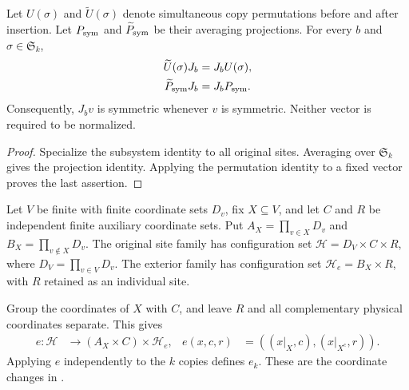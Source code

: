 \begin{theorem}
    \label{thm:added_site_insertion_copy_symmetry}
    \leanok
    Let $U(\sigma)$ and $\widetilde U(\sigma)$ denote simultaneous copy
    permutations before and after insertion. Let $P_{\rm sym}$ and
    $\widetilde P_{\rm sym}$ be their averaging projections.
    For every $b$ and $\sigma\in\mathfrak S_k$,
    \begin{align*}
        \widetilde U(\sigma)J_b&=J_bU(\sigma),\\
        \widetilde P_{\rm sym}J_b&=J_bP_{\rm sym}.
    \end{align*}
    Consequently, $J_bv$ is symmetric whenever $v$ is symmetric.
    Neither vector is required to be normalized.
\end{theorem}
\begin{proof}\leanok
    Specialize the subsystem identity to all original sites.
    Averaging over $\mathfrak S_k$ gives the projection identity.
    Applying the permutation identity to a fixed vector proves the last
    assertion.
\end{proof}

Let $V$ be finite with finite coordinate sets $D_v$, fix $X\subseteq V$,
and let $C$ and $R$ be independent finite auxiliary coordinate sets.
Put $A_X=\prod_{v\in X}D_v$ and
$B_X=\prod_{v\notin X}D_v$.
The original site family has configuration set
$\mathcal H=D_V\times C\times R$, where
$D_V=\prod_{v\in V}D_v$.
The exterior family has configuration set
$\mathcal H_e=B_X\times R$, with $R$ retained as an individual site.

\begin{definition}
    \label{def:bell_insertion_coordinates}
    \leanok
    Group the coordinates of $X$ with $C$, and leave $R$ and all
    complementary physical coordinates separate. This gives
    \begin{align*}
        e:\mathcal H&\longrightarrow(A_X\times C)\times\mathcal H_e,
        &
        e(x,c,r)&=((x|_X,c),(x|_{X^c},r)).
    \end{align*}
    Applying $e$ independently to the $k$ copies defines $e_k$.
    These are the coordinate changes in
    \cite[Section~8, lines~283--308]{OpenAI2026AreaLaw}.
\end{definition}


